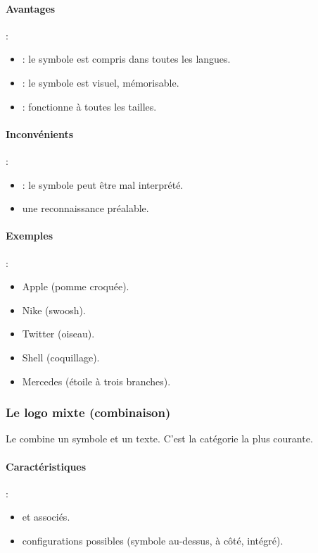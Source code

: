 \paragraph{Avantages} :
\begin{itemize}
    \item {} : le symbole est compris dans toutes les langues.
    \item {} : le symbole est visuel, mémorisable.
    \item {} : fonctionne à toutes les tailles.
\end{itemize}

\paragraph{Inconvénients} :
\begin{itemize}
    \item {} : le symbole peut être mal interprété.
    \item {} une reconnaissance préalable.
\end{itemize}

\paragraph{Exemples} :
\begin{itemize}
    \item Apple (pomme croquée).
    \item Nike (swoosh).
    \item Twitter (oiseau).
    \item Shell (coquillage).
    \item Mercedes (étoile à trois branches).
\end{itemize}

\subsubsection{Le logo mixte (combinaison)}

Le  combine un symbole et un texte. C'est la catégorie la plus courante.

\paragraph{Caractéristiques} :
\begin{itemize}
    \item {} et  associés.
    \item {} configurations possibles (symbole au-dessus, à côté, intégré).
\end{itemize}


